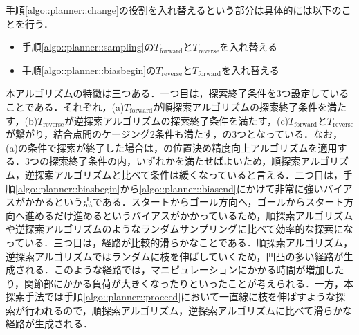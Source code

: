 \documentclass[a4paper,twoside,12pt,papersize, dvipdfmx]{iirthesis}
\begin{document}
手順\ref{algo::planner::change}の役割を入れ替えるという部分は具体的には以下のことを行う．
\begin{itemize}
\item 手順\ref{algo::planner::sampling}の$T_{\mathrm {forward}}$と$T_{\mathrm {reverse}}$を入れ替える
\item 手順\ref{algo::planner::biasbegin}の$T_{\mathrm {reverse}}$と$T_{\mathrm {forward}}$を入れ替える
\end{itemize}


本アルゴリズムの特徴は三つある．一つ目は，探索終了条件を3つ設定していることである．それぞれ，(a)$T_{\mathrm {forward}}$が順探索アルゴリズムの探索終了条件を満たす，(b)$T_{\mathrm {reverse}}$が逆探索アルゴリズムの探索終了条件を満たす，(c)$T_{\mathrm {forward}}$と$T_{\mathrm {reverse}}$が繋がり，結合点間のケージング2条件も満たす，の3つとなっている．なお，(a)の条件で探索が終了した場合は，の位置決め精度向上アルゴリズムを適用する．3つの探索終了条件の内，いずれかを満たせばよいため，順探索アルゴリズム，逆探索アルゴリズムと比べて条件は緩くなっていると言える．二つ目は，手順\ref{algo::planner::biasbegin}から\ref{algo::planner::biasend}にかけて非常に強いバイアスがかかるという点である．スタートからゴール方向へ，ゴールからスタート方向へ進めるだけ進めるというバイアスがかかっているため，順探索アルゴリズムや逆探索アルゴリズムのようなランダムサンプリングに比べて効率的な探索になっている．三つ目は，経路が比較的滑らかなことである．順探索アルゴリズム，逆探索アルゴリズムではランダムに枝を伸ばしていくため，凹凸の多い経路が生成される．このような経路では，マニピュレーションにかかる時間が増加したり，関節部にかかる負荷が大きくなったりといったことが考えられる．一方，本探索手法では手順\ref{algo::planner::proceed}において一直線に枝を伸ばすような探索が行われるので，順探索アルゴリズム，逆探索アルゴリズムに比べて滑らかな経路が生成される．
\end{document}

